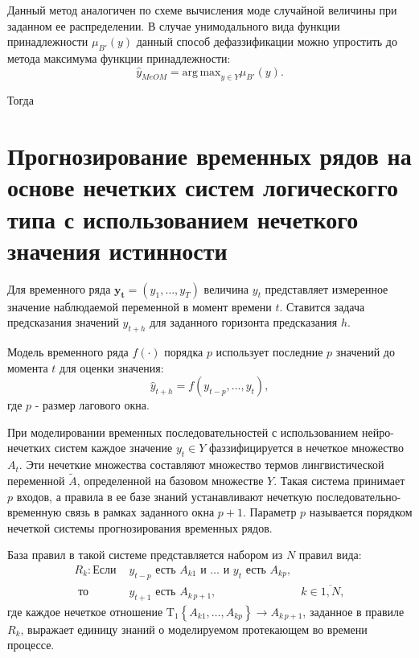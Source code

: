 Данный метод аналогичен по схеме вычисления моде случайной величины при заданном ее распределении. В случае унимодального вида функции принадлежности $\mu_{B'}(y)$ данный способ дефаззификации можно упростить до метода максимума функции принадлежности:
\[
\hat{y}_{MeOM} = \mathrm{arg\,max}_{y \in Y} \mu_{B'}(y).
\]

Тогда 


\section{Прогнозирование временных рядов на основе нечетких систем логическогго типа с использованием нечеткого значения истинности}

Для временного ряда $\mathbf{y_t} = (y_1, \dots, y_T)$ величина $y_t$ представляет измеренное значение наблюдаемой переменной в момент времени $t$. Ставится задача предсказания значений $\hat{y}_{t+h}$ для заданного горизонта предсказания $h$.

Модель временного ряда $f(\cdot)$ порядка $p$ использует последние $p$ значений до момента $t$ для оценки значения:
\[
	\hat{y}_{t+h} = f(y_{t-p}, \dots, y_t),
\]
где $p$ - размер лагового окна.

При моделировании временных последовательностей с использованием нейро-нечетких систем каждое значение $y_t\in Y$ фаззифицируется в нечеткое множество $A_t$. Эти нечеткие множества составляют множество термов лингвистической переменной $\tilde{A}$, определенной на базовом множестве $Y$. Такая система принимает $p$ входов, а правила в ее базе знаний устанавливают нечеткую последовательно-временную связь в рамках заданного окна $p+1$. Параметр $p$ называется порядком нечеткой системы прогнозирования временных рядов.

База правил в такой системе представляется набором из $N$ правил вида:
\begin{equation}
	\begin{aligned}
			R_k: \textrm{Если }&y_{t-p}\textrm{ есть }A_{k1}\textrm{ и }\dots\textrm{ и } y_{t}\textrm{ есть }A_{kp},&\\
			\textrm{ то }&y_{t+1}\textrm{ есть }A_{k\,p+1},&k\in\overline{1,N},
	\end{aligned}
\end{equation}
где каждое нечеткое отношение $\mathrm{T_1}\left\{A_{k1}, \dots, A_{kp}\right\} \rightarrow A_{k\,p+1}$, заданное в правиле $R_k$, выражает единицу  знаний о моделируемом протекающем во времени процессе.

